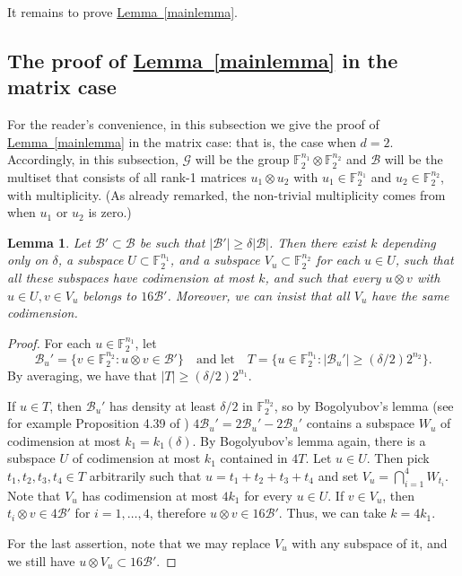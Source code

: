 \documentclass[11pt]{article}
\numberwithin{equation}{section}
\newtheorem{lemma}[theorem]{Lemma}
\theoremstyle{definition}
\theoremstyle{plain}
\newcommand{\expref}[2]{\hyperref[#2]{#1~\ref{#2}}}
\newcommand\F{\mathbb{F}}
\renewcommand\d{\delta}
\newcommand \cB{\mathcal B}
\newcommand \cG{\mathcal G}
\newcommand \s{\subset}
\begin{document}
It remains to prove \expref{Lemma}{mainlemma}.

\subsection{The proof of \expref{Lemma}{mainlemma} in the matrix case}

For the reader's convenience, in this subsection we give the proof of \expref{Lemma}{mainlemma} in the matrix case: that is, the case when $d=2$. Accordingly, in this subsection, $\cG$ will be the group $\F_2^{n_1}\otimes \F_2^{n_2}$ and $\cB$ will be the multiset that consists of all rank-1 matrices $u_1\otimes u_2$ with $u_1\in \F_2^{n_1}$ and $u_2\in \F_2^{n_2}$, with multiplicity. (As already remarked, the non-trivial multiplicity comes from when $u_1$ or $u_2$ is zero.)

\begin{lemma} \label{findstructure}
	Let $\cB'\subset \cB$ be such that $|\cB'|\geq \delta |\cB|$. Then there exist $k$ depending only on $\delta$, a subspace $U\subset \F_2^{n_1}$, and a subspace $V_u\subset\F_2^{n_2}$ for each $u\in U$, such that all these subspaces have codimension at most $k$, and such that every $u\otimes v$ with $u\in U,v\in V_u$ belongs to $16\cB'$. Moreover, we can insist that all $V_u$ have the same codimension.
\end{lemma}

\begin{proof}
  For each $u\in \F_2^{n_1}$, let
  \[
    \cB_u'=\{v\in \F_2^{n_2}: u\otimes v\in \cB'\} \quad\text{and let}\quad T=\{u\in \F_2^{n_1}: |\cB_u'|\geq ({\delta}/{2}) 2^{n_2}\}.
  \]
  By averaging, we have that $|T|\geq ({\delta}/{2}) 2^{n_1}$.
	
	If $u\in T$, then $\cB_u'$ has density at least ${\delta}/{2}$ in $\F_2^{n_2}$, so by Bogolyubov's lemma (see for example Proposition 4.39 of \cite{taovu}) $4\cB_u'=2\cB_u'-2\cB_u'$ contains a subspace $W_u$ of codimension at most $k_1=k_1(\d)$. By Bogolyubov's lemma again, there is a subspace $U$ of codimension at most $k_1$ contained in $4T$. Let $u\in U$. Then pick $t_1,t_2,t_3,t_4\in T$ arbitrarily such that $u=t_1+t_2+t_3+t_4$ and set $V_u=\bigcap_{i=1}^4 W_{t_i}$. Note that $V_u$ has codimension at most $4k_1$ for every $u\in U$. If $v\in V_u$, then $t_i\otimes v\in 4\cB'$ for $i=1,\dots,4$, therefore $u\otimes v\in 16\cB'$. Thus, we can take $k=4k_1$.
	
	For the last assertion, note that we may replace $V_u$ with any subspace of it, and we still have $u\otimes V_u\s 16\cB'$.
\end{proof}
\end{document}
